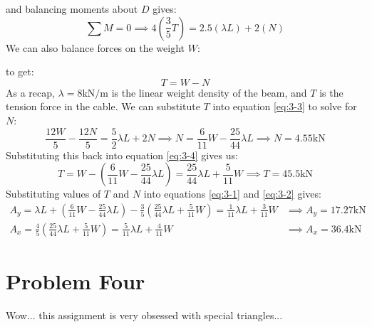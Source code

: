 \documentclass{article}
\begin{document}
and balancing moments about $D$ gives:
\begin{equation}
    \sum M = 0 \implies 4\left(\frac{3}{5}T\right)=2.5(\lambda L)+ 2(N)
    \label{eq:3-3}
\end{equation}
We can also balance forces on the weight $W$:
\begin{center}
\end{center}
to get:
\begin{equation}
    T = W - N
    \label{eq:3-4}
\end{equation}
As a recap, $\lambda=8\si{\kilo\newton\per\meter}$ is the linear weight density of the beam, and $T$ is the tension force in the cable. We can substitute $T$ into equation \ref{eq:3-3} to solve for $N$:
\begin{equation}
    \frac{12W}{5}-\frac{12N}{5}=\frac{5}{2}\lambda L + 2N \implies N = \frac{6}{11}W-\frac{25}{44}\lambda L \implies \boxed{N=4.55\si{\kilo\newton}}
    \label{eq:}
\end{equation}
Substituting this back into equation \ref{eq:3-4} gives us:
\begin{equation}
    T = W-\left(\frac{6}{11}W-\frac{25}{44}\lambda L\right) = \frac{25}{44}\lambda L + \frac{5}{11}W \implies \boxed{T=45.5\si{\kilo\newton}}
    \label{eq:}
\end{equation}
Substituting values of $T$ and $N$ into equations \ref{eq:3-1} and \ref{eq:3-2} gives:
\begin{align}
    A_y = \lambda L + \left(\frac{6}{11}W-\frac{25}{44}\lambda L\right)- \frac{3}{5}\left(\frac{25}{44}\lambda L + \frac{5}{11}W\right) = \frac{1}{11}\lambda L + \frac{3}{11}W &\implies \boxed{A_y=17.27\si{\kilo\newton}} \\ 
    A_x = \frac{4}{5}\left(\frac{25}{44}\lambda L + \frac{5}{11}W\right) = \frac{5}{11}\lambda L + \frac{4}{11}W &\implies \boxed{A_x=36.4\si{\kilo\newton}}
\end{align}

\newpage
\section{Problem Four}
Wow... this assignment is very obsessed with special triangles...
\end{document}
